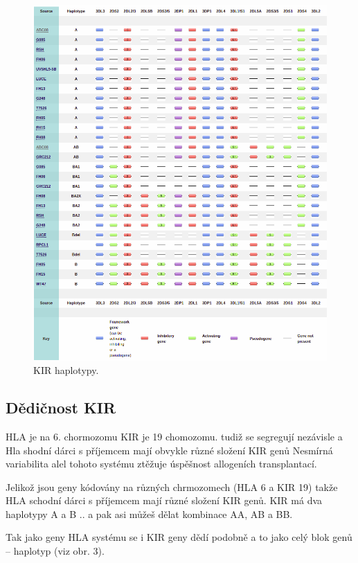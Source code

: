 \documentclass[czech,DP]{thesiskiv}
\begin{document}
\begin{figure}[H]		
		\centering
		\includegraphics[width=\textwidth]{./img/KIR_haplotypes.png}
		\caption{KIR haplotypy. \cite{ipd_database}}
		\label{fig:kir_haplotypes}
\end{figure}


\subsection{Dědičnost KIR}

HLA je na 6. chormozomu KIR je 19 chomozomu. tudiž se segregují nezávisle a Hla shodní dárci s příjemcem mají obvykle různé složení KIR genů
Nesmírná variabilita alel tohoto systému ztěžuje úspěšnost allogeních transplantací. 

Jelikož jsou geny kódovány na různých chrmozomech (HLA 6 a KIR 19) takže HLA schodní dárci s příjemcem mají různé složení KIR genů.
KIR má dva haplotypy A a B .. a pak asi můžeš dělat kombinace AA, AB a BB.

 Tak jako geny HLA systému se i KIR geny dědí podobně a to jako celý blok
genů – haplotyp (viz obr. 3).
\end{document}
